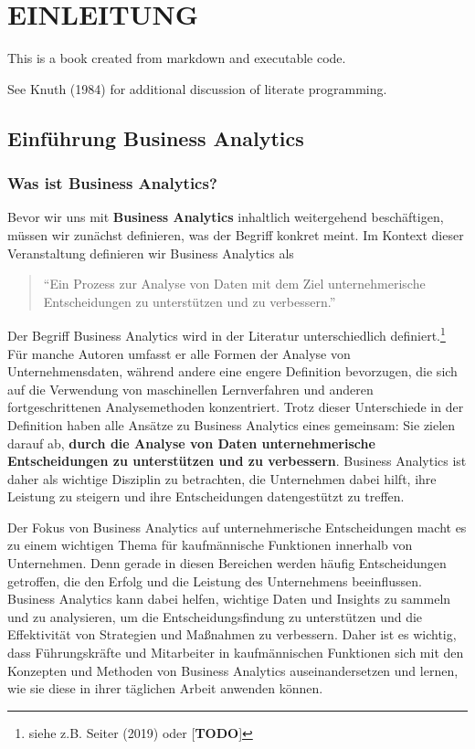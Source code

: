 \documentclass[
  letterpaper,
  DIV=11]{scrreprt}
\begin{document}

\part{EINLEITUNG}

This is a book created from markdown and executable code.

See Knuth (1984) for additional discussion of literate programming.

\hypertarget{einfuxfchrung-business-analytics}{%
\chapter{Einführung Business
Analytics}\label{einfuxfchrung-business-analytics}}

\hypertarget{was-ist-business-analytics}{%
\section{Was ist Business Analytics?}\label{was-ist-business-analytics}}

Bevor wir uns mit \textbf{Business Analytics} inhaltlich weitergehend
beschäftigen, müssen wir zunächst definieren, was der Begriff konkret
meint. Im Kontext dieser Veranstaltung definieren wir Business Analytics
als

\begin{quote}
``Ein Prozess zur Analyse von Daten mit dem Ziel unternehmerische
Entscheidungen zu unterstützen und zu verbessern.''
\end{quote}

Der Begriff Business Analytics wird in der Literatur unterschiedlich
definiert.\footnote{siehe z.B. Seiter (2019) oder {[}\textbf{TODO}{]}}
Für manche Autoren umfasst er alle Formen der Analyse von
Unternehmensdaten, während andere eine engere Definition bevorzugen, die
sich auf die Verwendung von maschinellen Lernverfahren und anderen
fortgeschrittenen Analysemethoden konzentriert. Trotz dieser
Unterschiede in der Definition haben alle Ansätze zu Business Analytics
eines gemeinsam: Sie zielen darauf ab, \textbf{durch die Analyse von
Daten unternehmerische Entscheidungen zu unterstützen und zu
verbessern}. Business Analytics ist daher als wichtige Disziplin zu
betrachten, die Unternehmen dabei hilft, ihre Leistung zu steigern und
ihre Entscheidungen datengestützt zu treffen.

Der Fokus von Business Analytics auf unternehmerische Entscheidungen
macht es zu einem wichtigen Thema für kaufmännische Funktionen innerhalb
von Unternehmen. Denn gerade in diesen Bereichen werden häufig
Entscheidungen getroffen, die den Erfolg und die Leistung des
Unternehmens beeinflussen. Business Analytics kann dabei helfen,
wichtige Daten und Insights zu sammeln und zu analysieren, um die
Entscheidungsfindung zu unterstützen und die Effektivität von Strategien
und Maßnahmen zu verbessern. Daher ist es wichtig, dass Führungskräfte
und Mitarbeiter in kaufmännischen Funktionen sich mit den Konzepten und
Methoden von Business Analytics auseinandersetzen und lernen, wie sie
diese in ihrer täglichen Arbeit anwenden können.
\end{document}
